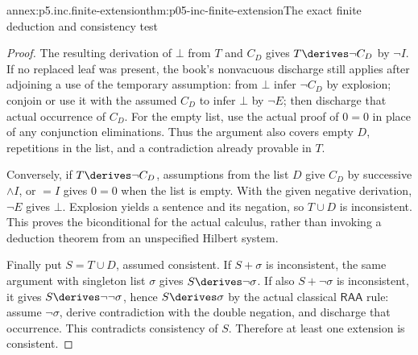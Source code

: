 \begin{annexitem}{annex:p5.inc.finite-extension}{thm:p05-inc-finite-extension}{The exact finite deduction and consistency test}
\begin{proof}
The resulting derivation of \(\bot\) from \(T\) and \(C_D\)
gives \(T\derives\neg C_D\) by \(\neg I\). If no replaced
leaf was present, the book's nonvacuous discharge still applies after
adjoining a use of the temporary assumption: from \(\bot\) infer
\(\neg C_D\) by explosion; conjoin or use it with the assumed
\(C_D\) to infer \(\bot\) by \(\neg E\); then discharge that
actual occurrence of \(C_D\). For the empty list, use the actual
proof of \(0=0\) in place of any conjunction eliminations. Thus the
argument also covers empty \(D\), repetitions in the list, and a
contradiction already provable in \(T\).

Conversely, if \(T\derives\neg C_D\), assumptions from the list
\(D\) give \(C_D\) by successive \(\land I\), or \(=I\)
gives \(0=0\) when the list is empty. With the given negative
derivation, \(\neg E\) gives \(\bot\). Explosion yields a
sentence and its negation, so \(T\cup D\) is inconsistent.
This proves the biconditional for the actual calculus, rather than
invoking a deduction theorem from an unspecified Hilbert system.

Finally put \(S=T\cup D\), assumed consistent. If \(S+\sigma\)
is inconsistent, the same argument with singleton list \(\sigma\)
gives \(S\derives\neg\sigma\). If also \(S+\neg\sigma\)
is inconsistent, it gives \(S\derives\neg\neg\sigma\), hence
\(S\derives\sigma\) by the actual classical \(\mathsf{RAA}\)
rule: assume \(\neg\sigma\), derive contradiction with the double
negation, and discharge that occurrence. This contradicts consistency
of \(S\). Therefore at least one extension is consistent.
\end{proof}
\end{annexitem}

